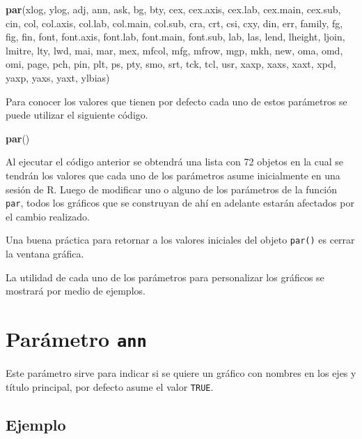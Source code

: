\documentclass[10pt,]{krantz}
\makeatletter
\newenvironment{Shaded}{\begin{snugshade}}{\end{snugshade}}
\newcommand{\KeywordTok}[1]{\textcolor[rgb]{0.13,0.29,0.53}{\textbf{{#1}}}}
\newcommand{\NormalTok}[1]{{#1}}
\let\proglang=\textsf
\newenvironment{kframe}{%
\medskip{}
\setlength{\fboxsep}{.8em}
 \def\at@end@of@kframe{}%
 \ifinner\ifhmode%
  \def\at@end@of@kframe{\end{minipage}}%
  \begin{minipage}{\columnwidth}%
 \fi\fi%
 \def\FrameCommand##1{\hskip\@totalleftmargin \hskip-\fboxsep
 \colorbox{shadecolor}{##1}\hskip-\fboxsep
     \hskip-\linewidth \hskip-\@totalleftmargin \hskip\columnwidth}%
 \MakeFramed {\advance\hsize-\width
   \@totalleftmargin\z@ \linewidth\hsize
   \@setminipage}}%
 {\par\unskip\endMakeFramed%
 \at@end@of@kframe}
\renewenvironment{Shaded}{\begin{kframe}}{\end{kframe}}
\let\BeginKnitrBlock\begin \let\EndKnitrBlock\end
\makeatother
\begin{document}
\begin{Shaded}
\begin{Highlighting}[]
\KeywordTok{par}\NormalTok{(xlog, ylog, adj, ann, ask, bg, bty, cex, cex.axis, cex.lab,}
    \NormalTok{cex.main, cex.sub, cin, col, col.axis, col.lab, col.main,}
    \NormalTok{col.sub, cra, crt, csi, cxy, din, err, family, fg, fig, fin,}
    \NormalTok{font, font.axis, font.lab, font.main, font.sub, lab, las, }
    \NormalTok{lend, lheight, ljoin, lmitre, lty, lwd, mai, mar, mex, mfcol,}
    \NormalTok{mfg, mfrow, mgp, mkh, new, oma, omd, omi, page, pch, pin, }
    \NormalTok{plt, ps, pty, smo, srt, tck, tcl, usr, xaxp, xaxs, xaxt, xpd, }
    \NormalTok{yaxp, yaxs, yaxt, ylbias)}
\end{Highlighting}
\end{Shaded}

Para conocer los valores que tienen por defecto cada uno de estos
parámetros se puede utilizar el siguiente código.

\begin{Shaded}
\begin{Highlighting}[]
\KeywordTok{par}\NormalTok{()}
\end{Highlighting}
\end{Shaded}

Al ejecutar el código anterior se obtendrá una lista con 72 objetos en
la cual se tendrán los valores que cada uno de los parámetros asume
inicialmente en una sesión de \proglang{R}. Luego de modificar uno o
alguno de los parámetros de la función \texttt{par}, todos los gráficos
que se construyan de ahí en adelante estarán afectados por el cambio
realizado.

\BeginKnitrBlock{rmdnote}
Una buena práctica para retornar a los valores iniciales del objeto
\texttt{par()} es cerrar la ventana gráfica.
\EndKnitrBlock{rmdnote}

La utilidad de cada uno de los parámetros para personalizar los gráficos
se mostrará por medio de ejemplos.

\section{\texorpdfstring{Parámetro \texttt{ann}
}{Parámetro ann  }}\label{parametro-ann}

Este parámetro sirve para indicar si se quiere un gráfico con nombres en
los ejes y título principal, por defecto asume el valor \texttt{TRUE}.

\subsection*{Ejemplo}\label{ejemplo-20}
\end{document}
